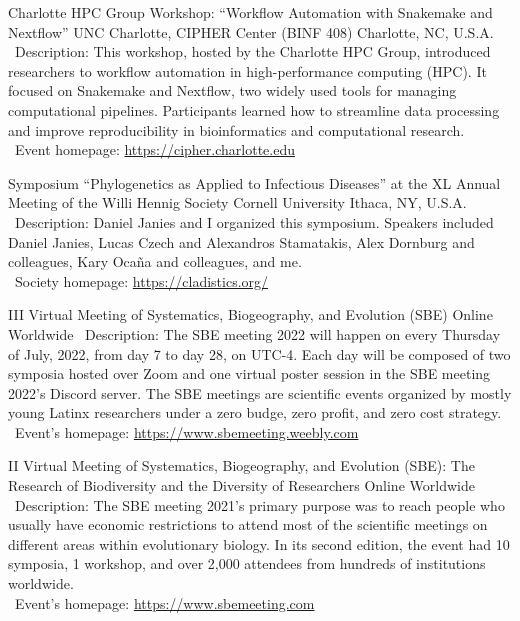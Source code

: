 \documentclass[11pt, letterpaper, sans]{moderncv}
\begin{document}
    {Charlotte HPC Group Workshop: ``Workflow Automation with Snakemake and Nextflow''}
    {UNC Charlotte, CIPHER Center (BINF 408)}
    {Charlotte, NC, U.S.A.}
    {}
    {
        \textbullet~Description: This workshop, hosted by the Charlotte HPC Group, introduced researchers to workflow automation in high-performance computing (HPC). It focused on Snakemake and Nextflow, two widely used tools for managing computational pipelines. Participants learned how to streamline data processing and improve reproducibility in bioinformatics and computational research.\\
        \textbullet~Event homepage: \url{https://cipher.charlotte.edu}
    }

    {Symposium ``Phylogenetics as Applied to Infectious Diseases'' at the XL Annual Meeting of the Willi Hennig Society}
    {Cornell University}
    {Ithaca, NY, U.S.A.}
    {}
    {
        \textbullet~Description: Daniel Janies and I organized this symposium. Speakers included Daniel Janies, Lucas Czech and Alexandros Stamatakis, Alex Dornburg and colleagues, Kary Ocaña and colleagues, and me.\\
        \textbullet~Society homepage: \url{https://cladistics.org/}
    }

	{III Virtual Meeting of Systematics, Biogeography, and Evolution (SBE)}
	{Online}
	{Worldwide}
	{}
	{
		\textbullet~Description: The SBE meeting 2022 will happen on every Thursday of July, 2022, from day 7 to day 28, on UTC-4. Each day will be composed of two symposia hosted over Zoom and one virtual poster session in the SBE meeting 2022's Discord server. The SBE meetings are scientific events organized by mostly young Latinx researchers under a zero budge, zero profit, and zero cost strategy.\\
		\textbullet~Event's homepage: \url{https://www.sbemeeting.weebly.com}
	}

	{II Virtual Meeting of Systematics, Biogeography, and Evolution (SBE): The Research of Biodiversity and the Diversity of Researchers}
	{Online}
	{Worldwide}
	{}
	{
		\textbullet~Description: The SBE meeting 2021's primary purpose was to reach people who usually have economic restrictions to attend most of the scientific meetings on different areas within evolutionary biology. In its second edition, the event had 10 symposia, 1 workshop, and over 2,000 attendees from hundreds of institutions worldwide.\\
		\textbullet~Event's homepage: \url{https://www.sbemeeting.com}
	}
\end{document}

